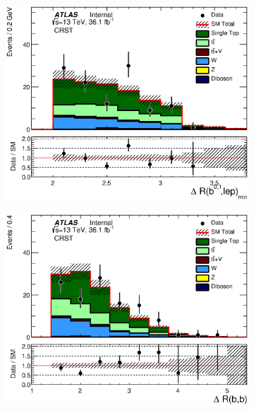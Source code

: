 \begin{figure}[h!]
\begin{center}
      \begin{subfigure}[b]{0.40\textwidth}    
\includegraphics[width=\textwidth]{figures/singleTop/postfit/MinDRBLep_CRST.eps}
                \caption{ }
    \end{subfigure}
      \begin{subfigure}[b]{0.40\textwidth}    
\includegraphics[width=\textwidth]{figures/singleTop/postfit/DRBB_CRST.eps}
                \caption{ }
    \end{subfigure}

\end{center}
\end{figure}
